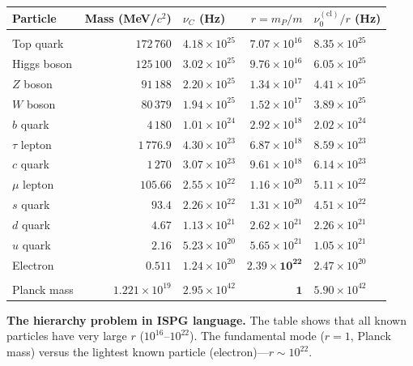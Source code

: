 \documentclass[11pt]{article}
\begin{document}
\begin{center}
\renewcommand{\arraystretch}{1.3}
\begin{tabular}{@{}lrlrl@{}}
\textbf{Particle}
  & \textbf{Mass (MeV/$c^2$)}
  & \textbf{$\nu_C$ (Hz)}
  & \textbf{$r = m_P/m$}
  & \textbf{$\nu_0^{(\mathrm{cl})}/r$ (Hz)} \\[2pt]
\hline\\[-6pt]
Top quark
  & $172\,760$
  & $4.18 \times 10^{25}$
  & $7.07 \times 10^{16}$
  & $8.35 \times 10^{25}$ \\
Higgs boson
  & $125\,100$
  & $3.02 \times 10^{25}$
  & $9.76 \times 10^{16}$
  & $6.05 \times 10^{25}$ \\
$Z$ boson
  & $91\,188$
  & $2.20 \times 10^{25}$
  & $1.34 \times 10^{17}$
  & $4.41 \times 10^{25}$ \\
$W$ boson
  & $80\,379$
  & $1.94 \times 10^{25}$
  & $1.52 \times 10^{17}$
  & $3.89 \times 10^{25}$ \\
$b$ quark
  & $4\,180$
  & $1.01 \times 10^{24}$
  & $2.92 \times 10^{18}$
  & $2.02 \times 10^{24}$ \\
$\tau$ lepton
  & $1\,776.9$
  & $4.30 \times 10^{23}$
  & $6.87 \times 10^{18}$
  & $8.59 \times 10^{23}$ \\
$c$ quark
  & $1\,270$
  & $3.07 \times 10^{23}$
  & $9.61 \times 10^{18}$
  & $6.14 \times 10^{23}$ \\
$\mu$ lepton
  & $105.66$
  & $2.55 \times 10^{22}$
  & $1.16 \times 10^{20}$
  & $5.11 \times 10^{22}$ \\
$s$ quark
  & $93.4$
  & $2.26 \times 10^{22}$
  & $1.31 \times 10^{20}$
  & $4.51 \times 10^{22}$ \\
$d$ quark
  & $4.67$
  & $1.13 \times 10^{21}$
  & $2.62 \times 10^{21}$
  & $2.26 \times 10^{21}$ \\
$u$ quark
  & $2.16$
  & $5.23 \times 10^{20}$
  & $5.65 \times 10^{21}$
  & $1.05 \times 10^{21}$ \\
Electron
  & $0.511$
  & $1.24 \times 10^{20}$
  & $\mathbf{2.39 \times 10^{22}}$
  & $2.47 \times 10^{20}$ \\[4pt]
\hline\\[-6pt]
Planck mass
  & $1.221 \times 10^{19}$
  & $2.95 \times 10^{42}$
  & $\mathbf{1}$
  & $5.90 \times 10^{42}$ \\
\end{tabular}
\end{center}

\medskip
\textbf{The hierarchy problem in ISPG language.}
The table shows that all known particles have very large $r$
($10^{16}$--$10^{22}$). The fundamental mode ($r = 1$, Planck
mass) versus the lightest known particle (electron)---$r \sim
10^{22}$.
\end{document}
